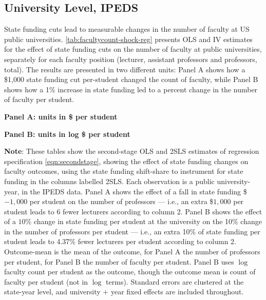 \subsection{University Level, IPEDS}
\label{sec:results-ipeds}
State funding cuts lead to measurable changes in the number of faculty at US public universities.
\autoref{tab:facultycount-shock-reg} presents OLS and IV estimates for the effect of state funding cuts on the number of faculty at public universities, separately for each faculty position (lecturer, assistant professors and professors, total).
The results are presented in two different units: Panel A shows how a \$1,000 state funding cut per-student changed the count of faculty, while Panel B shows how a 1\% increase in state funding led to a percent change in the number of faculty per student.

\begin{table}[!htp]
    \singlespacing
    \centering
    \caption{Effects of State Funding on Faculty Counts, in IPEDS Data 1990--2021, OLS and 2SLS Estimates.}

    \textbf{Panel A: units in \$ per student}

    \makebox[\textwidth][c]{}
    
    \textbf{Panel B: units in log \$ per student}
    
    \makebox[\textwidth][c]{}

    \label{tab:facultycount-shock-reg}
    \justify
    \footnotesize
    \textbf{Note}:
    These tables show the second-stage OLS and 2SLS estimates of regression specification \eqref{eqn:secondstage}, showing the effect of state funding changes on faculty outcomes, using the state funding shift-share to instrument for state funding in the columns labelled 2SLS.
    Each observation is a public university-year, in the IPEDS data.
    Panel A shows the effect of a fall in state funding \$$-1,000$ per student on the number of professors --- i.e.,
    an extra \$$1,000$ per student leads to 6 fewer lecturers according to column 2.
    Panel B shows the effect of a $10$\% change in state funding per student at the university on the 10\% change in the number of professors per student --- i.e.,
    an extra 10\% of state funding per student leads to 4.37\% fewer lecturers per student according to column 2.
    Outcome-mean is the mean of the outcome, for Panel A the number of professors per student, for Panel B the number of faculty per student.
    Panel B uses $\log$ faculty count per student as the outcome, though the outcome mean is count of faculty per student (not in $\log$ terms).
    Standard errors are clustered at the state-year level, and university $+$ year fixed effects are included throughout.
\end{table}

